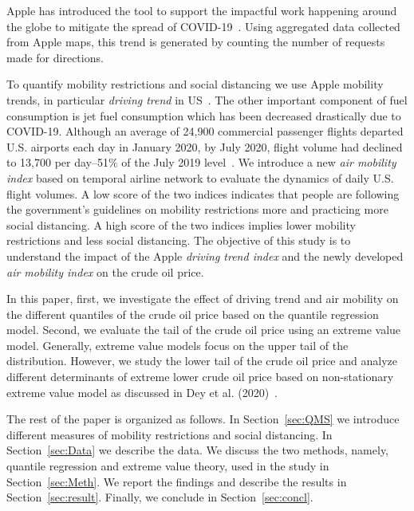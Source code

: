 \documentclass[review]{elsarticle}
\begin{document}
Apple has introduced the tool to support the impactful work happening around the globe to mitigate the spread of COVID-19~\citep{appleMob}. 
Using aggregated data collected from Apple maps, this trend is generated by counting the number of requests made for directions. 

To quantify mobility restrictions and social distancing we use Apple mobility trends, in particular \textit{driving trend} in US~\citep{appleMob}. 
The other important component of fuel consumption is jet fuel consumption which has been decreased drastically due to COVID-19. Although an average of 24,900 commercial passenger flights departed U.S. airports each day in January 2020, by July 2020, flight volume had declined to 13,700 per day--51\% of the July 2019 level~\citep{EIAB2020}. 
We introduce a new \textit{air mobility index} based on temporal airline network to evaluate the dynamics of daily U.S. flight volumes. A low score of the two indices indicates that people are following the government's guidelines on mobility restrictions more and practicing more social distancing. A high score of the two indices implies lower mobility restrictions and less social distancing. The objective of this study is to understand the impact of the Apple \textit{driving trend index} and the newly developed  \textit{air mobility index} on the crude oil price.

In this paper, first, we investigate the effect of driving trend and air mobility on the different quantiles of the crude oil price based on the quantile regression model. Second, we evaluate the tail of the crude oil price using an extreme value model. Generally, extreme value models focus on the upper tail of the distribution. However, we
study the lower tail of the crude oil price and analyze different determinants of extreme lower crude oil price based on non-stationary extreme value model as discussed in Dey et al. (2020)~\citep{Dey2020}.


The rest of the paper is organized as follows. In Section~\ref{sec:QMS} we introduce different measures of mobility restrictions and social distancing. In Section~\ref{sec:Data} we describe the data. We discuss the two methods, namely, quantile regression and extreme value theory, used in the study in Section~\ref{sec:Meth}. We report the findings and describe the results in Section~\ref{sec:result}. Finally, we conclude in Section~\ref{sec:concl}.




\end{document}
